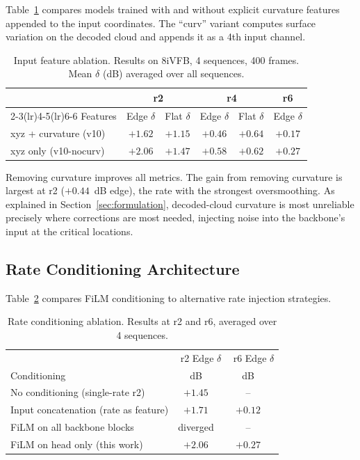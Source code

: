 Table~\ref{tab:ablation-curvature} compares models trained with and without
explicit curvature features appended to the input coordinates.
The ``curv'' variant computes surface variation on the decoded cloud and
appends it as a 4th input channel.

\begin{table}[t]
  \centering
  \caption{%
    Input feature ablation. Results on 8iVFB, 4 sequences, 400 frames.
    Mean $\delta$ (dB) averaged over all sequences.
  }
  \label{tab:ablation-curvature}
  \begin{tabular}{lccccc}
    \toprule
    & \multicolumn{2}{c}{r2} & \multicolumn{2}{c}{r4} & r6 \\
    \cmidrule(lr){2-3}\cmidrule(lr){4-5}\cmidrule(lr){6-6}
    Features & Edge $\delta$ & Flat $\delta$ & Edge $\delta$ & Flat $\delta$ & Edge $\delta$ \\
    \midrule
    xyz + curvature (v10)      & $+1.62$ & $+1.15$ & $+0.46$ & $+0.64$ & $+0.17$ \\
    xyz only (v10-nocurv)      & $\mathbf{+2.06}$ & $\mathbf{+1.47}$ & $\mathbf{+0.58}$ & $\mathbf{+0.62}$ & $\mathbf{+0.27}$ \\
    \bottomrule
  \end{tabular}
\end{table}

Removing curvature improves all metrics.
The gain from removing curvature is largest at r2 ($+0.44$~dB edge), the rate
with the strongest oversmoothing.
As explained in Section~\ref{sec:formulation}, decoded-cloud curvature is
most unreliable precisely where corrections are most needed, injecting noise
into the backbone's input at the critical locations.

\subsection{Rate Conditioning Architecture}
\label{ssec:ablation-film}

Table~\ref{tab:ablation-film} compares FiLM conditioning to alternative
rate injection strategies.

\begin{table}[t]
  \centering
  \caption{%
    Rate conditioning ablation. Results at r2 and r6, averaged over 4 sequences.
  }
  \label{tab:ablation-film}
  \begin{tabular}{lcccc}
    \toprule
    & \multicolumn{2}{c}{r2 Edge $\delta$} & \multicolumn{2}{c}{r6 Edge $\delta$} \\
    Conditioning & dB & & dB & \\
    \midrule
    No conditioning (single-rate r2) & $+1.45$ & & -- &\\
    Input concatenation (rate as feature) & $+1.71$ & & $+0.12$ & \\
    FiLM on all backbone blocks & diverged & & -- &\\
    FiLM on head only (this work) & $\mathbf{+2.06}$ & & $\mathbf{+0.27}$ & \\
    \bottomrule
  \end{tabular}
\end{table}

